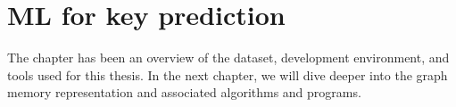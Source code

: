 \section{ML for key prediction}



The chapter has been an overview of the dataset, development environment, and tools used for this thesis. In the next chapter, we will dive deeper into the graph memory representation and associated algorithms and programs.

